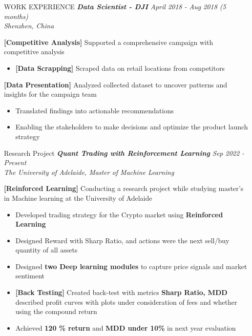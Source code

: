 \documentclass{resume} %
\begin{document}
\begin{rSection}{WORK EXPERIENCE}
\sl\textbf{Data Scientist - DJI} \hfill {April 2018 - Aug 2018 (5 months)}\\
Shenzhen, China\

\item [\textbullet] \textbf{[Competitive Analysis]} Supported a comprehensive campaign with competitive analysis
\begin{itemize}
    \item [\textbullet] \textbf{[Data Scrapping]} Scraped data on retail locations from competitors
\end{itemize}

\item [\textbullet] \textbf{[Data Presentation]} Analyzed collected dataset to uncover patterns and insights for the campaign team
\begin{itemize}
    \item Translated findings into actionable recommendations
    \item Enabling the stakeholders to make decisions and optimize the product launch strategy
\end{itemize}


\end{rSection} 

\begin{rSection}{Research Project} 
\sl\textbf{Quant Trading with Reinforcement Learning} \hfill Sep 2022 - Present\\
The University of Adelaide, Master of Machine Learning\

\item [\textbullet] \textbf{[Reinforced Learning]} Conducting a research project while studying master's in Machine learning at the University of Adelaide
\begin{itemize}
    \item Developed trading strategy for the Crypto market using \textbf{Reinforced Learning}
    \item Designed Reward with Sharp Ratio, and actions were the next sell/buy quantity of all assets
    \item Designed \textbf{two Deep learning modules} to capture price signals and market sentiment
    \item [\textbullet] \textbf{[Back Testing]} Created back-test with metrics \textbf{Sharp Ratio, MDD} described profit curves with plots under consideration of fees and whether using the compound return
    \item Achieved \textbf{120 \% return} and \textbf{MDD under 10\%} in next year evaluation
\end{itemize}

\end{rSection} 
\end{document}

